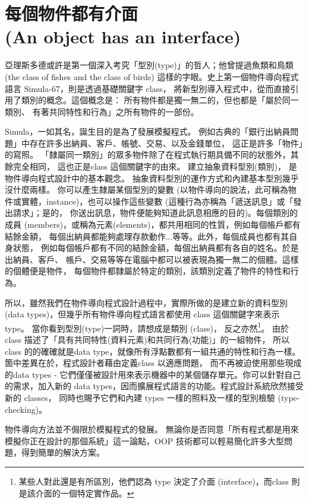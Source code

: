 \section{每個物件都有介面 \\(An object has an interface)}
亞理斯多德或許是第一個深入考究「型別(type)」的哲人；他曾提過魚類和鳥類
(the class of fishes and the class of birds)
這樣的字眼。史上第一個物件導向程式語言 Simula-67，則是透過基礎關鍵字 class，
將新型別導入程式中，從而直接引用了類別的概念。這個概念是：
所有物件都是獨一無二的，但也都是「屬於同一類別、
有著共同特性和行為」之所有物件的一部份。

Simula，一如其名，誕生目的是為了發展模擬程式。
例如古典的「銀行出納員問題」中存在許多出納員、客戶、帳號、交易、以及金錢單位，
這正是許多「物件」的寫照。
「隸屬同一類別」的眾多物件除了在程式執行期具備不同的狀態外，其餘完全相同，
這也正是class 這個關鍵字的由來。 建立抽象資料型別(類別)，
是物件導向程式設計中的基本觀念。
抽象資料型別的運作方式和內建基本型別幾乎沒什麼兩樣。
你可以產生隸屬某個型別的變數
(以物件導向的說法，此可稱為物件或實體，instance)，也可以操作這些變數
(這種行為亦稱為「遞送訊息」或「發出請求」；是的，
你送出訊息，物件便能夠知道此訊息相應的目的)。每個類別的成員
(members)，或稱為元素(elements)，都共用相同的性質，例如每個帳戶都有結餘金額，
每個出納員都能夠處理存款動作...等等。此外，每個成員也都有其自身狀態，
例如每個帳戶都有不同的結餘金額，每個出納員都有各自的姓名。於是出納員、客戶、
帳戶、交易等等在電腦中都可以被表現為獨一無二的個體。這樣的個體便是物件，
每個物件都隸屬於特定的類別，該類別定義了物件的特性和行為。

所以，雖然我們在物件導向程式設計過程中，實際所做的是建立新的資料型別
(data types)，但幾乎所有物件導向程式語言都使用 class 這個關鍵字來表示 type。
當你看到型別(type)一詞時，請想成是類別 (class)，
反之亦然\footnote{某些人對此還是有所區別，他們認為 type 決定了介面
(interface)，而class 則是該介面的一個特定實作品。}。
由於 class 描述了「具有共同特性(資料元素)和共同行為(功能)」的一組物件，
所以 class 的的確確就是data type，就像所有浮點數都有一組共通的特性和行為一樣。
箇中差異在於，程式設計者藉由定義class 以適應問題，
而不再被迫使用那些現成的data types -
它們僅僅被設計用來表示機器中的某個儲存單元。你可以針對自己的需求，加入新的
data types，因而擴展程式語言的功能。程式設計系統欣然接受新的 classes，
同時也賜予它們和內建 types 一樣的照料及一樣的型別檢驗 (type- checking)。

物件導向方法並不侷限於模擬程式的發展。
無論你是否同意「所有程式都是用來模擬你正在設計的那個系統」這一論點，OOP
技術都可以輕易簡化許多大型問題，得到簡單的解決方案。


